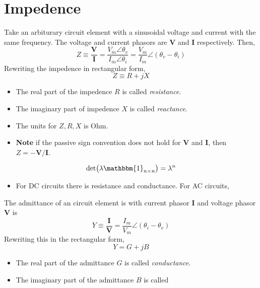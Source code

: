 \documentclass{article}
\begin{document}
\section{Impedence}
\begin{definition}
    Take an arbiturary circuit element with a sinusoidal voltage and current with the same frequency. The voltage and current phasors are $\mathbf V$ and $\mathbf I$ respectively. Then,
    \begin{equation}
        Z\equiv\frac{\mathbf V}{\mathbf I}=\frac{V_m\angle\theta_v}{I_m\angle\theta_i}=\frac{V_m}{I_m}\angle(\theta_v-\theta_i)
    \end{equation}
    Rewriting the impedence in rectangular form, 
    \begin{equation}
        Z\equiv R+jX
    \end{equation}

    \begin{itemize}
        \item The real part of the impedence $R$ is called \textit{resistance}. 
        \item The imaginary part of impedence $X$ is called \textit{reactance}. 
        \item The units for $Z,R,X$ is Ohm.
        \item \textbf{Note} if the passive sign convention does not hold for $\mathbf V$ and $\mathbf I$, then $Z=-\mathbf V/\mathbf I$.
    \end{itemize}

    \begin{equation}
        \det(\lambda \mathbbm{1}_{n\times n})=\lambda^n
    \end{equation}
\end{definition}
\begin{itemize}
    \item For DC circuits there is resistance and conductance. For AC circuits,
\end{itemize}
\begin{definition}
    The admittance of an circuit element is with current phasor $\mathbf{I}$ and voltage phasor $\mathbf{V}$ is 
    \begin{equation}
        Y\equiv\frac{\mathbf I}{\mathbf V}=\frac{I_m}{V_m}\angle(\theta_i-\theta_v)
    \end{equation}
    Rewriting this in the rectangular form, 
    \begin{equation}
        Y=G+jB
    \end{equation}
    \begin{itemize}
        \item The real part of the admittance $G$ is called \textit{conductance}.
        \item The imaginary part of the admittance $B$ is called
    \end{itemize}
\end{definition}
\end{document}

